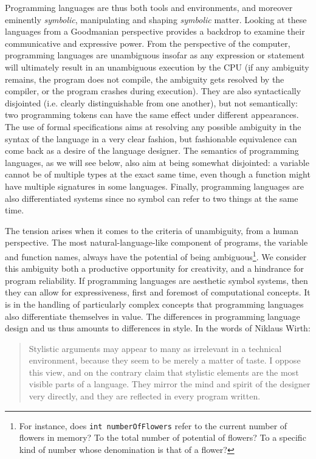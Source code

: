 Programming languages are thus both tools and environments, and moreover eminently \emph{symbolic}, manipulating and shaping \emph{symbolic} matter. Looking at these languages from a Goodmanian perspective provides a backdrop to examine their communicative and expressive power. From the perspective of the computer, programming languages are unambiguous insofar as any expression or statement will ultimately result in an unambiguous execution by the CPU (if any ambiguity remains, the program does not compile, the ambiguity gets resolved by the compiler, or the program crashes during execution). They are also syntactically disjointed (i.e. clearly distinguishable from one another), but not semantically: two programming tokens can have the same effect under different appearances. The use of formal specifications aims at resolving any possible ambiguity in the syntax of the language in a very clear fashion, but fashionable equivalence can come back as a desire of the language designer. The semantics of programming languages, as we will see below, also aim at being somewhat disjointed: a variable cannot be of multiple types at the exact same time, even though a function might have multiple signatures in some languages. Finally, programming languages are also differentiated systems since no symbol can refer to two things at the same time.

The tension arises when it comes to the criteria of unambiguity, from a human perspective. The most natural-language-like component of programs, the variable and function names, always have the potential of being ambiguous\footnote{For instance, does \lstinline{int numberOfFlowers} refer to the current number of flowers in memory? To the total number of potential of flowers? To a specific kind of number whose denomination is that of a flower?}. We consider this ambiguity both a productive opportunity for creativity, and a hindrance for program reliability. If programming languages are aesthetic symbol systems, then they can allow for expressiveness, first and foremost of computational concepts. It is in the handling of particularly complex concepts that programming languages also differentiate themselves in value. The differences in programming language design and us thus amounts to differences in style. In the words of Niklaus Wirth:

\begin{quote}
  Stylistic arguments may appear to many as irrelevant in a technical environment, because they seem to be merely a matter of taste. I oppose this view, and on the contrary claim that stylistic elements are the most visible parts of a language. They mirror the mind and spirit of the designer very directly, and they are reflected in every program written. \citep{wirth_essence_2003}
\end{quote}

